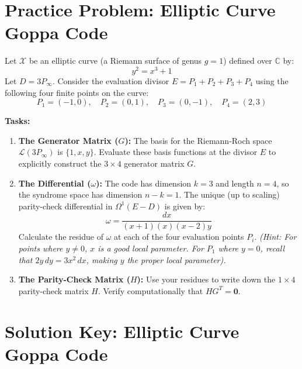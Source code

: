 \documentclass[11pt, a4paper, twoside]{article}
\newcommand{\C}{\mathbb{C}}
\newcommand{\X}{\mathcal{X}}
\begin{document}
	\section*{Practice Problem: Elliptic Curve Goppa Code}
	
	\begin{problembox}
		Let $\X$ be an elliptic curve (a Riemann surface of genus $g=1$) defined over $\C$ by:
		$$ y^2 = x^3 + 1 $$
		Let $D = 3P_\infty$. Consider the evaluation divisor $E = P_1 + P_2 + P_3 + P_4$ using the following four finite points on the curve:
		$$ P_1 = (-1, 0), \quad P_2 = (0, 1), \quad P_3 = (0, -1), \quad P_4 = (2, 3) $$
		
		\textbf{Tasks:}
		\begin{enumerate}
			\item \textbf{The Generator Matrix ($G$):} The basis for the Riemann-Roch space $\mathcal{L}(3P_\infty)$ is $\{1, x, y\}$. Evaluate these basis functions at the divisor $E$ to explicitly construct the $3 \times 4$ generator matrix $G$.
			\item \textbf{The Differential ($\omega$):} The code has dimension $k=3$ and length $n=4$, so the syndrome space has dimension $n-k = 1$. The unique (up to scaling) parity-check differential in $\Omega^1(E-D)$ is given by:
			$$ \omega = \frac{dx}{(x+1)(x)(x-2)y} $$
			Calculate the residue of $\omega$ at each of the four evaluation points $P_i$. \textit{(Hint: For points where $y \neq 0$, $x$ is a good local parameter. For $P_1$ where $y=0$, recall that $2y \,dy = 3x^2 \,dx$, making $y$ the proper local parameter).}
			\item \textbf{The Parity-Check Matrix ($H$):} Use your residues to write down the $1 \times 4$ parity-check matrix $H$. Verify computationally that $H G^T = \mathbf{0}$.
		\end{enumerate}
	\end{problembox}
	
	\newpage
	
	\section*{Solution Key: Elliptic Curve Goppa Code}
	
\end{document}
